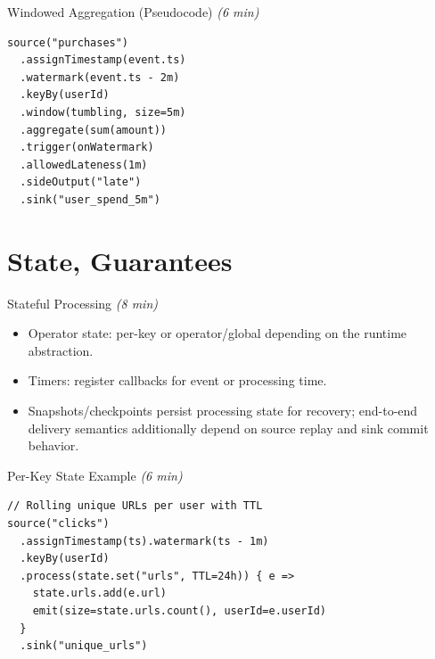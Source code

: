 \documentclass[aspectratio=169,11pt]{beamer}
\newcommand{\mins}[1]{\textit{(#1 min)}}
\begin{document}
\begin{frame}[fragile]{Windowed Aggregation (Pseudocode) \mins{6}}
\begin{lstlisting}
source("purchases")
  .assignTimestamp(event.ts)
  .watermark(event.ts - 2m)
  .keyBy(userId)
  .window(tumbling, size=5m)
  .aggregate(sum(amount))
  .trigger(onWatermark)
  .allowedLateness(1m)
  .sideOutput("late")
  .sink("user_spend_5m")
\end{lstlisting}
\end{frame}

\section{State, Guarantees}
\begin{frame}{Stateful Processing \mins{8}}
  \begin{itemize}
    \item Operator state: per-key or operator/global depending on the runtime abstraction.
    \item Timers: register callbacks for event or processing time.
    \item Snapshots/checkpoints persist processing state for recovery; end-to-end delivery semantics additionally depend on source replay and sink commit behavior.
  \end{itemize}
\end{frame}

\begin{frame}[fragile]{Per-Key State Example \mins{6}}
\begin{lstlisting}
// Rolling unique URLs per user with TTL
source("clicks")
  .assignTimestamp(ts).watermark(ts - 1m)
  .keyBy(userId)
  .process(state.set("urls", TTL=24h)) { e =>
    state.urls.add(e.url)
    emit(size=state.urls.count(), userId=e.userId)
  }
  .sink("unique_urls")
\end{lstlisting}
\end{frame}
\end{document}
